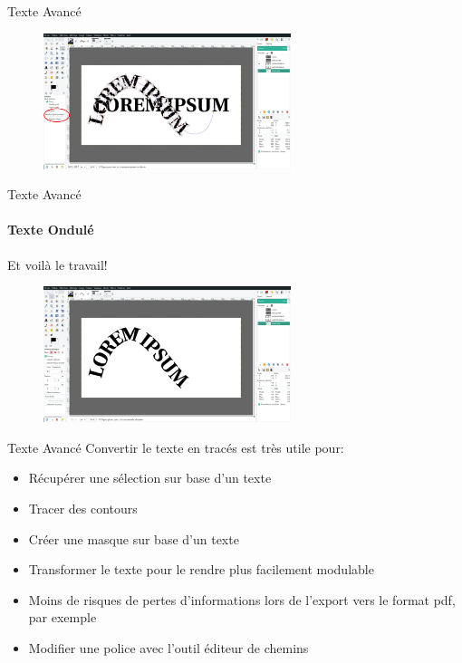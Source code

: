 \documentclass[10pt,svgnames,usenames,table]{beamer}
\begin{document}
\begin{frame}{Texte Avancé}
\begin{enumerate}
{				\begin{figure}
					\centering
					\includegraphics[height=150px]{Images/text/courb4}
				\end{figure}
			}
		\end{enumerate}
\end{frame}


\begin{frame}{Texte Avancé}
	\framesubtitle{Texte Ondulé}
	Et voilà le travail!
	\begin{figure}
	\centering
		\includegraphics[height=150px]{Images/text/courb5}
	\end{figure}
\end{frame}

\begin{frame}{Texte Avancé}
	Convertir le texte en tracés est très utile pour:
	\begin{itemize}
	\item Récupérer une sélection sur base d'un texte
	\item Tracer des contours
	\item Créer une masque sur base d'un texte
	\item Transformer le texte pour le rendre plus facilement modulable
	\item Moins de risques de pertes d'informations lors de l'export vers le format pdf, par exemple
	\item Modifier une police avec l'outil éditeur de chemins
	\end{itemize}
\end{frame}
\end{document}
